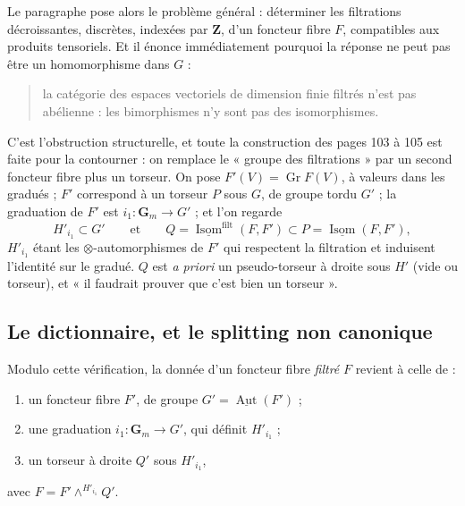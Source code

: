 \documentclass[11pt,a4paper]{article}
\begin{document}
Le paragraphe pose alors le problème général : déterminer les filtrations
décroissantes, discrètes, indexées par $\mathbf{Z}$, d'un foncteur fibre $F$,
compatibles aux produits tensoriels. Et il énonce immédiatement pourquoi la
réponse ne peut pas être un homomorphisme dans $G$ :
\begin{quote}
la catégorie des espaces vectoriels de dimension finie filtrés n'est pas
abélienne : les bimorphismes n'y sont pas des isomorphismes.
\end{quote}
C'est l'obstruction structurelle, et toute la construction des pages 103 à 105
est faite pour la contourner : on remplace le « groupe des filtrations » par un
second foncteur fibre plus un torseur. On pose $F'(V) = \operatorname{Gr}F(V)$,
à valeurs dans les gradués ; $F'$ correspond à un torseur $P$ sous $G$, de
groupe tordu $G'$ ; la graduation de $F'$ est $i_{1} \colon \mathbf{G}_{m} \to
G'$ ; et l'on regarde
\[
H'_{i_{1}} \subset G'
\qquad\text{et}\qquad
Q = \underline{\operatorname{Isom}}^{\mathrm{filt}}(F, F') \subset
P = \underline{\operatorname{Isom}}(F, F') ,
\]
$H'_{i_{1}}$ étant les $\otimes$-automorphismes de $F'$ qui respectent la
filtration et induisent l'identité sur le gradué. $Q$ est \emph{a priori} un
pseudo-torseur à droite sous $H'$ (vide ou torseur), et « il faudrait
prouver que c'est bien un torseur ».

\subsection*{Le dictionnaire, et le splitting non canonique}

Modulo cette vérification, la donnée d'un foncteur fibre \emph{filtré} $F$
revient à celle de :
\begin{enumerate}
\item[(i)] un foncteur fibre $F'$, de groupe $G' =
\underline{\operatorname{Aut}}(F')$ ;
\item[(ii)] une graduation $i_{1} \colon \mathbf{G}_{m} \to G'$, qui définit
$H'_{i_{1}}$ ;
\item[(iii)] un torseur à droite $Q'$ sous $H'_{i_{1}}$,
\end{enumerate}
avec $F = F' \wedge^{H'_{i_{1}}} Q'$.
\end{document}
